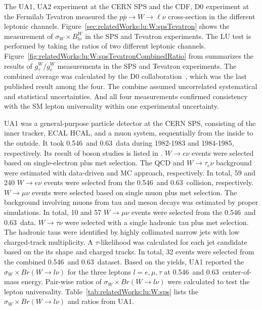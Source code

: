 The UA1, UA2 experiment at the CERN SPS and the CDF, D0 experiment at the Fermilab Tevatron measured the $p\bar{p} \to W \to \ell\nu$ cross-section in the different leptonic channels. Figure~\ref{sec:relatedWorks:lu:W:spsTevatron} shows the measurement of $\sigma_W \times B^W_{l \nu}$ in the SPS and Tevatron experiments. The LU test is performed by taking the ratios of two different leptonic channels. Figure~\ref{fig:relatedWorks:lu:W:spsTevatronCombinedRatio} from \cite{Abbott:1999pk} summarizes the results of $g^W_\tau / g^W_e$ measurements in the SPS and Tevatron experiments. The combined average was calculated by the D0 collaboration~\cite{Abbott:1999pk}, which was the last published result among the four. The combine assumed uncorrelated systematical and statistical uncertainties. And all four measurements confirmed consistency with the SM lepton universality within one experimental uncertainty.









UA1 was a general-purpose particle detector at the CERN SPS, consisting of the inner tracker, ECAL HCAL, and a muon system, sequentially from the inside to the outside.  It took 0.546~\TeV and 0.63~\TeV data during 1982-1983 and 1984-1985, respectively. Its result of \PW boson studies is listed in \cite{Albajar:1988ka}. $W \to e \nu$ events were selected based on single-electron plus met selection. The QCD and $W\to \tau_e \nu$ background were estimated with data-driven and MC approach, respectively. In total, 59 and 240 $W \to e \nu$ events were selected from the 0.546~\TeV and 0.63~\TeV collision, respectively.  $W \to \mu \nu$ events were selected based on single muon plus met selection. The background involving muons from tau and meson decays was estimated by proper simulations. In total, 10 and 57 $W\to \mu\nu$ events were selected from the 0.546~\TeV and 0.63~\TeV data.  $W\to \tau \nu$ were selected with a single hadronic tau plus met selection. The hadronic taus were identified by highly collimated narrow jets with low charged-track multiplicity.  A $\tau$-likelihood was calculated for each jet candidate based on the its shape and charged tracks. In total, 32 events were selected from the combined 0.546~\TeV and 0.63~\TeV dataset. Based on the yields, UA1 reported the $\sigma_W \times Br(W\to l\nu) $ for the three leptons $l=e,\mu,\tau$ at 0.546~\TeV and 0.63~\TeV center-of-mass energy. Pair-wise ratios of  $\sigma_W \times Br(W\to l\nu) $ were calculated to test the lepton universality. Table~\ref{tab:relatedWorks:lu:W:sps} lists the $\sigma_W \times Br(W\to l\nu) $ and ratios from UA1.




